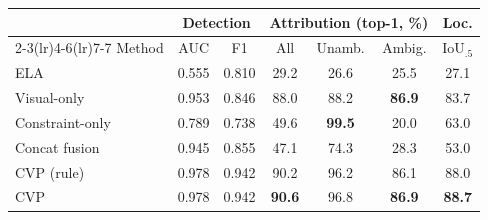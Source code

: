 \begin{tabular}{lcccccc}
\toprule
 & \multicolumn{2}{c}{Detection} & \multicolumn{3}{c}{Attribution (top-1, \%)} & Loc.\\
\cmidrule(lr){2-3}\cmidrule(lr){4-6}\cmidrule(lr){7-7}
Method & AUC & F1 & All & Unamb. & Ambig. & IoU$_{.5}$\\
\midrule
ELA & 0.555 & 0.810 & 29.2 & 26.6 & 25.5 & 27.1\\
Visual-only & 0.953 & 0.846 & 88.0 & 88.2 & \textbf{86.9} & 83.7\\
Constraint-only & 0.789 & 0.738 & 49.6 & \textbf{99.5} & 20.0 & 63.0\\
Concat fusion & 0.945 & 0.855 & 47.1 & 74.3 & 28.3 & 53.0\\
CVP (rule) & 0.978 & 0.942 & 90.2 & 96.2 & 86.1 & 88.0\\
CVP & 0.978 & 0.942 & \textbf{90.6} & 96.8 & \textbf{86.9} & \textbf{88.7}\\
\bottomrule
\end{tabular}
